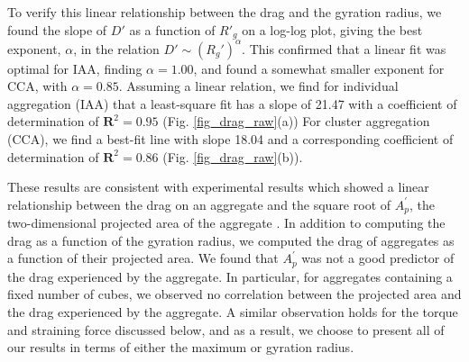 To verify this linear relationship between the drag and the gyration radius, we found the slope of $D'$ as a function of $R'_g$ on a log-log plot, giving the best exponent, $\alpha$, in the relation $D' \sim (R_g')^\alpha$. This confirmed that a linear fit was optimal for IAA, finding $\alpha=1.00$, and found a somewhat smaller exponent for CCA, with $\alpha=0.85$. Assuming a linear relation, we find
for individual aggregation (IAA) that a least-square fit has a slope of 21.47 with  a coefficient of determination of $\mathbf{R}^2=0.95$ (Fig. \ref{fig_drag_raw}(a)) 
For cluster aggregation (CCA), we find a best-fit line with slope 18.04 and a corresponding coefficient of determination of $\mathbf{R}^2=0.86$ (Fig. \ref{fig_drag_raw}(b)). 



These results are consistent with experimental results which showed a linear relationship between the drag on an aggregate and the square root of $A^\prime_p$, the two-dimensional projected area of the aggregate \cite{tang_model_2002}.  In addition to computing the drag as a function of the gyration radius, we computed the drag of aggregates as a function of their projected area. We found that $A^\prime_p$ was not a good predictor of the drag experienced by the aggregate. In particular, for aggregates containing a fixed number of cubes, we observed no correlation between the projected area and the drag experienced by the aggregate. A similar observation holds for the torque and straining force discussed below, and as a result, we choose to present all of our results in terms of either the maximum or gyration radius.

